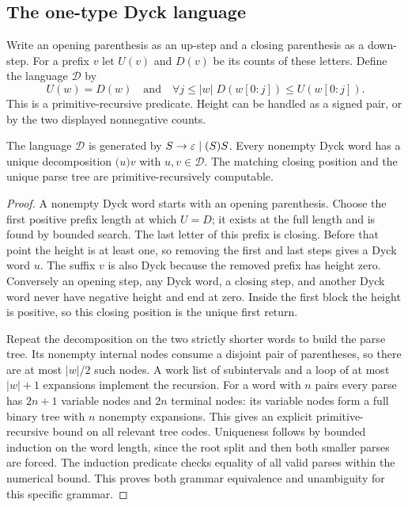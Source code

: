 \subsection{The one-type Dyck language}

Write an opening parenthesis as an up-step and a closing parenthesis as
a down-step. For a prefix $v$ let $U(v)$ and $D(v)$ be its counts of
these letters. Define the language $\mathcal D$ by
\[
 U(w)=D(w)\quad\text{and}\quad
 \forall j\le |w|\;D(w[0:j])\le U(w[0:j]).
\]
This is a primitive-recursive predicate. Height can be handled as a
signed pair, or by the two displayed nonnegative counts.

\begin{theorem}
\label{count:dyck}
The language $\mathcal D$ is generated by
$S\to\varepsilon\mid\mathtt{(}S\mathtt{)}S$.
Every nonempty Dyck word has a unique decomposition
$\mathtt{(}u\mathtt{)}v$ with $u,v\in\mathcal D$.
The matching closing position and the unique parse tree are
primitive-recursively computable.
\end{theorem}
\begin{proof}
A nonempty Dyck word starts with an opening parenthesis. Choose the first
positive prefix length at which $U=D$; it exists at the full length and
is found by bounded search. The last letter of this prefix is closing.
Before that point the height is at least one, so removing the first and
last steps gives a Dyck word $u$. The suffix $v$ is also Dyck because
the removed prefix has height zero. Conversely an opening step, any
Dyck word, a closing step, and another Dyck word never have negative
height and end at zero. Inside the first block the height is positive,
so this closing position is the unique first return.

Repeat the decomposition on the two strictly shorter words to build
the parse tree. Its nonempty internal nodes consume a disjoint pair
of parentheses, so there are at most $|w|/2$ such nodes. A work list
of subintervals and a loop of at most $|w|+1$ expansions implement the
recursion. For a word with $n$ pairs every parse has $2n+1$ variable
nodes and $2n$ terminal nodes: its variable nodes form a full binary
tree with $n$ nonempty expansions. This gives an explicit
primitive-recursive bound on all relevant tree codes. Uniqueness follows
by bounded induction on the word length, since the root split and then
both smaller parses are forced. The induction predicate checks equality
of all valid parses within the numerical bound. This proves
both grammar equivalence and unambiguity for this specific grammar.
\end{proof}


